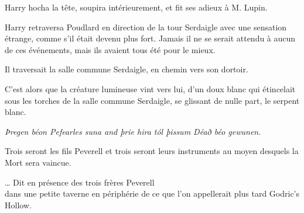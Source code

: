 Harry hocha la tête, soupira intérieurement, et fit ses adieux à M. Lupin.

\later

Harry retraversa Poudlard en direction de la tour Serdaigle avec une sensation étrange, comme s'il était devenu plus fort.
Jamais il ne se serait attendu à aucun de ces événements, mais ils avaient tous été pour le mieux.

Il traversait la salle commune Serdaigle, en chemin vers son dortoir.

C'est alors que la créature lumineuse vint vers lui, d'un doux blanc qui étincelait sous les torches de la salle commune Serdaigle, se glissant de nulle part, le serpent blanc.

\later
\begin{center}
\emph{Þregen béon Pefearles suna and þrie hira tól þissum Déað béo gewunen.}

Trois seront les fils Peverell et trois seront leurs instruments au moyen desquels la Mort sera vaincue.

… Dit en présence des trois frères Peverell\\
dans une petite taverne en périphérie de ce que l'on appellerait plus tard Godric's Hollow.
\end{center}

